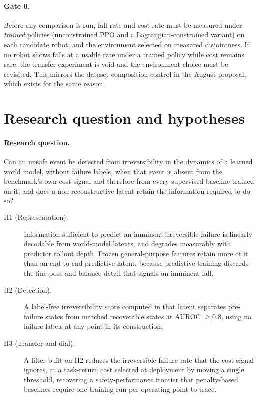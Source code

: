 \documentclass[11pt,a4paper]{article}
\begin{document}
\paragraph{Gate 0.} Before any comparison is run, fall rate and cost rate must be measured
under \emph{trained} policies (unconstrained PPO and a Lagrangian-constrained variant) on each
candidate robot, and the environment selected on measured disjointness. If no robot shows
falls at a usable rate under a trained policy while cost remains rare, the transfer
experiment is void and the environment choice must be revisited. This mirrors the
dataset-composition control in the August proposal, which exists for the same reason.

\section{Research question and hypotheses}

\paragraph{Research question.} Can an unsafe event be detected from irreversibility in the
dynamics of a learned world model, without failure labels, when that event is absent from the
benchmark's own cost signal and therefore from every supervised baseline trained on it; and
does a non-reconstructive latent retain the information required to do so?

\begin{description}
  \item[H1 (Representation).] Information sufficient to predict an imminent irreversible
    failure is linearly decodable from world-model latents, and degrades measurably with
    predictor rollout depth. Frozen general-purpose features retain more of it than an
    end-to-end predictive latent, because predictive training discards the fine pose and
    balance detail that signals an imminent fall.
  \item[H2 (Detection).] A label-free irreversibility score computed in that latent separates
    pre-failure states from matched recoverable states at AUROC $\geq 0.8$, using no failure
    labels at any point in its construction.
  \item[H3 (Transfer and dial).] A filter built on H2 reduces the irreversible-failure rate
    that the cost signal ignores, at a task-return cost selected at deployment by moving a
    single threshold, recovering a safety-performance frontier that penalty-based baselines
    require one training run per operating point to trace.
\end{description}
\end{document}
